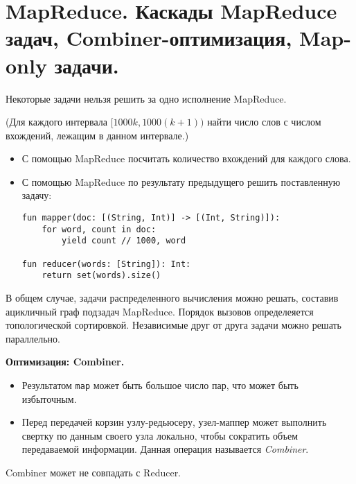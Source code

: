 \section{MapReduce. Каскады MapReduce задач, Combiner-оптимизация, Map-only
  задачи.}

Некоторые задачи нельзя решить за одно исполнение MapReduce.


\begin{example}(Для каждого интервала $[1000k, 1000(k + 1))$ найти число слов с
  числом вхождений, лежащим в данном интервале.)
  \begin{itemize}
    \item С помощью MapReduce посчитать количество вхождений для каждого слова.
    \item С помощью MapReduce по результату предыдущего решить поставленную
      задачу:
      \begin{lstlisting}
fun mapper(doc: [(String, Int)] -> [(Int, String)]):
    for word, count in doc:
        yield count // 1000, word

fun reducer(words: [String]): Int:
    return set(words).size()
      \end{lstlisting}
  \end{itemize}
\end{example}

\begin{proposition}
  В общем случае, задачи распределенного вычисления можно решать, составив
  ацикличный граф подзадач MapReduce. Порядок вызовов определеяется
  топологической сортировкой. Независимые друг от друга задачи можно решать
  параллельно.
\end{proposition}

\textbf{Оптимизация: Combiner.}
\begin{itemize}
  \item Результатом \texttt{map} может быть большое число пар, что может быть
    избыточным.
  \item Перед передачей корзин узлу-редьюсеру, узел-маппер может выполнить
    свертку по данным своего узла локально, чтобы сократить объем передаваемой
    информации. Данная операция называется \textit{Combiner}.
\end{itemize}

\begin{remark} Combiner может не совпадать с Reducer.
\end{remark}

